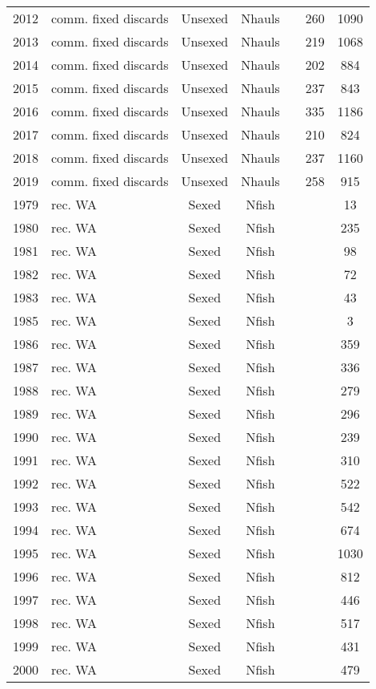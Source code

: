 \begin{longtable}[t]{c>{\centering\arraybackslash}p{3cm}ccccc}
2012 & comm. fixed discards & Unsexed & Nhauls &  & 260 & 1090\\
2013 & comm. fixed discards & Unsexed & Nhauls &  & 219 & 1068\\
2014 & comm. fixed discards & Unsexed & Nhauls &  & 202 & 884\\
2015 & comm. fixed discards & Unsexed & Nhauls &  & 237 & 843\\
2016 & comm. fixed discards & Unsexed & Nhauls &  & 335 & 1186\\
2017 & comm. fixed discards & Unsexed & Nhauls &  & 210 & 824\\
2018 & comm. fixed discards & Unsexed & Nhauls &  & 237 & 1160\\
2019 & comm. fixed discards & Unsexed & Nhauls &  & 258 & 915\\
1979 & rec. WA & Sexed & Nfish &  &  & 13\\
1980 & rec. WA & Sexed & Nfish &  &  & 235\\
1981 & rec. WA & Sexed & Nfish &  &  & 98\\
1982 & rec. WA & Sexed & Nfish &  &  & 72\\
1983 & rec. WA & Sexed & Nfish &  &  & 43\\
1985 & rec. WA & Sexed & Nfish &  &  & 3\\
1986 & rec. WA & Sexed & Nfish &  &  & 359\\
1987 & rec. WA & Sexed & Nfish &  &  & 336\\
1988 & rec. WA & Sexed & Nfish &  &  & 279\\
1989 & rec. WA & Sexed & Nfish &  &  & 296\\
1990 & rec. WA & Sexed & Nfish &  &  & 239\\
1991 & rec. WA & Sexed & Nfish &  &  & 310\\
1992 & rec. WA & Sexed & Nfish &  &  & 522\\
1993 & rec. WA & Sexed & Nfish &  &  & 542\\
1994 & rec. WA & Sexed & Nfish &  &  & 674\\
1995 & rec. WA & Sexed & Nfish &  &  & 1030\\
1996 & rec. WA & Sexed & Nfish &  &  & 812\\
1997 & rec. WA & Sexed & Nfish &  &  & 446\\
1998 & rec. WA & Sexed & Nfish &  &  & 517\\
1999 & rec. WA & Sexed & Nfish &  &  & 431\\
2000 & rec. WA & Sexed & Nfish &  &  & 479\\

\end{longtable}
